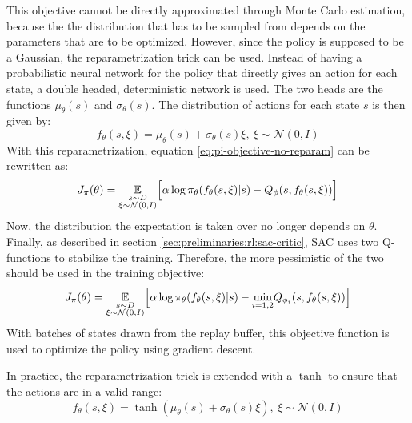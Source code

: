 This objective cannot be directly approximated through Monte Carlo estimation, because the the distribution that has to be sampled from depends on the parameters that are to be optimized. However, since the policy is supposed to be a Gaussian, the reparametrization trick can be used. Instead of having a probabilistic neural network for the policy that directly gives an action for each state, a double headed, deterministic network is used. The two heads are the functions $\mu_\theta(s)$ and $\sigma_\theta(s)$. The distribution of actions for each state $s$ is then given by:
\begin{equation}
    f_\theta(s, \xi) = \mu_\theta(s) + \sigma_\theta(s)\xi,~ \xi \sim \mathcal{N}(0, I)
    \label{eq:reparam-trick}
\end{equation}
With this reparametrization, equation \ref{eq:pi-objective-no-reparam} can be rewritten as:
\begin{equation}
    J_\pi(\theta) = \underset{\begin{subarray}{c}
        s\sim D\\
        \xi\sim \mathcal{N}(0, I)
    \end{subarray}}{\mathbb{E}}\Big[\alpha\log\pi_\theta(f_\theta(s, \xi)|s)-Q_\phi(s,f_\theta(s, \xi))\Big]
\end{equation}
Now, the distribution the expectation is taken over no longer depends on $\theta$. Finally, as described in section \ref{sec:preliminaries:rl:sac-critic}, SAC uses two Q-functions to stabilize the training. Therefore, the more pessimistic of the two should be used in the training objective:
\begin{equation}
    J_\pi(\theta) = \underset{\begin{subarray}{c}
        s\sim D\\
        \xi\sim \mathcal{N}(0, I)
    \end{subarray}}{\mathbb{E}}\Big[\alpha\log\pi_\theta(f_\theta(s, \xi)|s)-\underset{i=1,2}{\min}Q_{\phi_i}(s,f_\theta(s, \xi))\Big]
    \label{eq:actor-loss}
\end{equation}
With batches of states drawn from the replay buffer, this objective function is used to optimize the policy using gradient descent.

In practice, the reparametrization trick is extended with a $\tanh$ to ensure that the actions are in a valid range:
\begin{equation}
    f_\theta(s, \xi) = \tanh(\mu_\theta(s) + \sigma_\theta(s)\xi),~ \xi \sim \mathcal{N}(0, I)
\end{equation}

